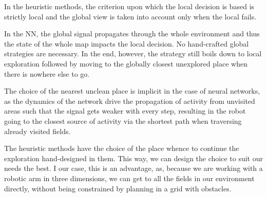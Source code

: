 \documentclass[buriama8_dp.tex]{subfiles}
\begin{document}
In the heuristic methods, the criterion upon which the local decision is based is strictly local and the global view is taken into account only when the local fails.

In the NN, the global signal propagates through the whole environment and thus the state of the whole map impacts the local decision. No hand-crafted global strategies are necessary. In the end, however, the strategy still boils down to local exploration followed by moving to the globally closest unexplored place when there is nowhere else to go.

The choice of the nearest unclean place is implicit  in the case of neural networks, as the dynamics of the network drive the propagation of activity from unvisited areas such that the signal gets weaker with every step, resulting in the robot going to the closest source of activity via the shortest path when traversing already visited fields.

The heuristic methods have the choice of the place whence to continue the exploration hand-designed in them. This way, we can design the choice to suit our needs the best.  I our case, this is an advantage, as, because we are working with a robotic arm in three dimensions, we can get to all the fields in our environment directly, without being constrained by planning in a grid with obstacles.
\end{document}
